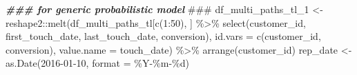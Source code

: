 \documentclass[
]{book}
\newenvironment{Shaded}{\begin{snugshade}}{\end{snugshade}}
\newcommand{\AlertTok}[1]{\textcolor[rgb]{0.94,0.16,0.16}{#1}}
\newcommand{\AttributeTok}[1]{\textcolor[rgb]{0.77,0.63,0.00}{#1}}
\newcommand{\DecValTok}[1]{\textcolor[rgb]{0.00,0.00,0.81}{#1}}
\newcommand{\DocumentationTok}[1]{\textcolor[rgb]{0.56,0.35,0.01}{\textbf{\textit{#1}}}}
\newcommand{\FunctionTok}[1]{\textcolor[rgb]{0.00,0.00,0.00}{#1}}
\newcommand{\NormalTok}[1]{#1}
\newcommand{\OtherTok}[1]{\textcolor[rgb]{0.56,0.35,0.01}{#1}}
\newcommand{\SpecialCharTok}[1]{\textcolor[rgb]{0.00,0.00,0.00}{#1}}
\newcommand{\StringTok}[1]{\textcolor[rgb]{0.31,0.60,0.02}{#1}}
\begin{document}
\begin{Shaded}
\begin{Highlighting}[]
\DocumentationTok{\#\#\# for generic probabilistic model }\AlertTok{\#\#\#}
\NormalTok{df\_multi\_paths\_tl\_1 }\OtherTok{\textless{}{-}}\NormalTok{ reshape2}\SpecialCharTok{::}\FunctionTok{melt}\NormalTok{(df\_multi\_paths\_tl[}\FunctionTok{c}\NormalTok{(}\DecValTok{1}\SpecialCharTok{:}\DecValTok{50}\NormalTok{), ] }\SpecialCharTok{\%\textgreater{}\%} \FunctionTok{select}\NormalTok{(customer\_id, first\_touch\_date, last\_touch\_date, conversion),}
                    \AttributeTok{id.vars =} \FunctionTok{c}\NormalTok{(}\StringTok{\textquotesingle{}customer\_id\textquotesingle{}}\NormalTok{, }\StringTok{\textquotesingle{}conversion\textquotesingle{}}\NormalTok{),}
                    \AttributeTok{value.name =} \StringTok{\textquotesingle{}touch\_date\textquotesingle{}}\NormalTok{) }\SpecialCharTok{\%\textgreater{}\%}
        \FunctionTok{arrange}\NormalTok{(customer\_id)}
\NormalTok{rep\_date }\OtherTok{\textless{}{-}} \FunctionTok{as.Date}\NormalTok{(}\StringTok{\textquotesingle{}2016{-}01{-}10\textquotesingle{}}\NormalTok{, }\AttributeTok{format =} \StringTok{\textquotesingle{}\%Y{-}\%m{-}\%d\textquotesingle{}}\NormalTok{)}
 

\end{Highlighting}
\end{Shaded}
\end{document}
